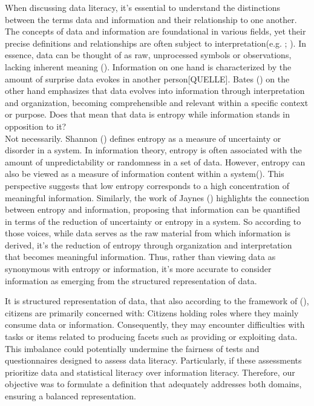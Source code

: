 \documentclass[
  12pt,
  a4paper,
  twoside]{article}
\begin{document}
When discussing data literacy, it's essential to understand the
distinctions between the terms data and information and their
relationship to one another. The concepts of data and information are
foundational in various fields, yet their precise definitions and
relationships are often subject to interpretation(e.g.
;
). In essence, data can be
thought of as raw, unprocessed symbols or observations, lacking inherent
meaning (). Information on one
hand is characterized by the amount of surprise data evokes in another
person{[}QUELLE{]}. Bates () on the other
hand emphasizes that data evolves into information through
interpretation and organization, becoming comprehensible and relevant
within a specific context or purpose. Does that mean that data is
entropy while information stands in opposition to it?\\
Not necessarily. Shannon () defines
entropy as a measure of uncertainty or disorder in a system. In
information theory, entropy is often associated with the amount of
unpredictability or randomness in a set of data. However, entropy can
also be viewed as a measure of information content within a
system(). This perspective
suggests that low entropy corresponds to a high concentration of
meaningful information. Similarly, the work of Jaynes
() highlights the connection between
entropy and information, proposing that information can be quantified in
terms of the reduction of uncertainty or entropy in a system. So
according to those voices, while data serves as the raw material from
which information is derived, it's the reduction of entropy through
organization and interpretation that becomes meaningful information.
Thus, rather than viewing data as synonymous with entropy or
information, it's more accurate to consider information as emerging from
the structured representation of data.

It is structured representation of data, that also according to the
framework of (), citizens
are primarily concerned with: Citizens holding roles where they mainly
consume data or information. Consequently, they may encounter
difficulties with tasks or items related to producing facets such as
providing or exploiting data. This imbalance could potentially undermine
the fairness of tests and questionnaires designed to assess data
literacy. Particularly, if these assessments prioritize data and
statistical literacy over information literacy. Therefore, our objective
was to formulate a definition that adequately addresses both domains,
ensuring a balanced representation.
\end{document}
